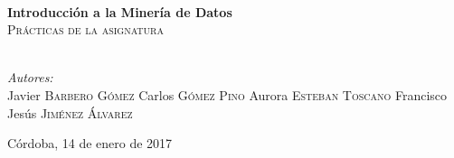 \begin{titlepage}
  \HRule \\[0.4cm]
  { \huge \bfseries Introducción a la Minería de Datos}\\[0.4cm] %
  \textsc{\large Prácticas de la asignatura}\\[0.5cm]
  \HRule \\[1.5cm]
  
  
      \begin{minipage}{0.4\textwidth}
        \begin{flushleft} \large
          \emph{Autores:}\\
          Javier \textsc{Barbero Gómez}
          Carlos \textsc{Gómez Pino}
          Aurora \textsc{Esteban Toscano}
          Francisco Jesús \textsc{Jiménez Álvarez}
        \end{flushleft}
      \end{minipage}
  


{\large Córdoba, 14 de enero de 2017}\\[2cm] %




\vfill %

\end{titlepage}
